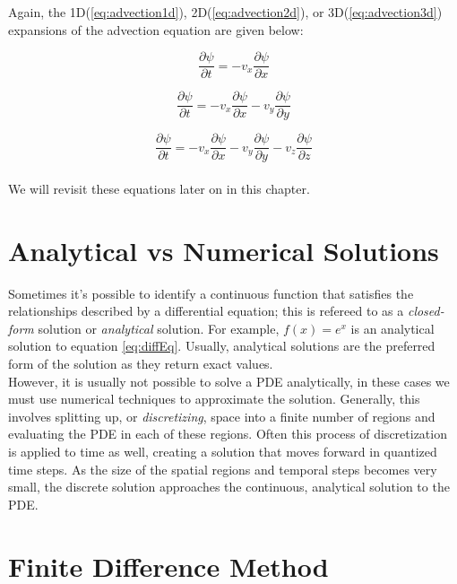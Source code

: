 {    Again, the 1D(\ref{eq:advection1d}), 2D(\ref{eq:advection2d}), or 3D(\ref{eq:advection3d}) expansions of the advection equation are given below:
 
 \begin{equation}\label{eq:advection1d}
  \frac{\partial \psi}{\partial t} = -v_{x}\frac{\partial \psi}{\partial x}
  \end{equation}
  
   \begin{equation}\label{eq:advection2d}
  \frac{\partial \psi}{\partial t} = -v_{x}\frac{\partial \psi}{\partial x}-v_{y}\frac{\partial \psi}{\partial y}
  \end{equation}
  
   \begin{equation}\label{eq:advection3d}
  \frac{\partial \psi}{\partial t} = -v_{x}\frac{\partial \psi}{\partial x}-v_{y}\frac{\partial \psi}{\partial y}-v_{z}\frac{\partial \psi}{\partial z}
  \end{equation}
  \\
  We will revisit these equations later on in this chapter.
   
\section{Analytical vs Numerical Solutions}

Sometimes it's possible to identify a continuous function that satisfies the relationships described by a differential equation; this is refereed to as a \textit{closed-form} solution or \textit{analytical} solution.  For example, $f(x)=e^{x}$ is an analytical solution to equation \ref{eq:diffEq}.  Usually, analytical solutions are the preferred form of the solution as they return exact values.\\

However, it is usually not possible to solve a PDE analytically, in these cases we must use numerical techniques to approximate the solution.  Generally, this involves splitting up, or \textit{discretizing}, space into a finite number of regions and evaluating the PDE in each of these regions.  Often this process of discretization is applied to time as well, creating a solution that moves forward in quantized time steps.  As the size of the spatial regions and temporal steps becomes very small, the discrete solution approaches the continuous, analytical solution to the PDE.

\section{Finite Difference Method}

}
